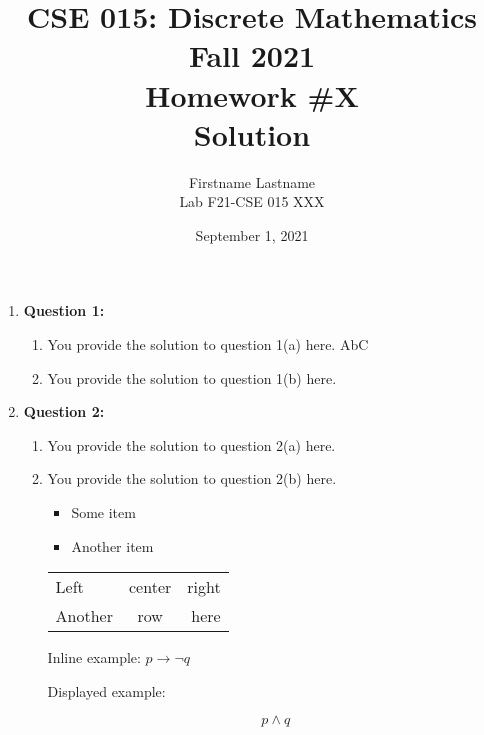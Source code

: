 \documentclass[11pt]{article}
\begin{document}
\author{Firstname Lastname\\
Lab F21-CSE 015 XXX}

\title{CSE 015: Discrete Mathematics\\
Fall 2021\\
Homework \#X\\
Solution}

\date{September 1, 2021}
\maketitle

\begin{enumerate}

\item
\textbf{Question 1:}

\begin{enumerate}[label=(\alph*)]
\item
You provide the solution to question 1(a) here.
AbC

\item
You provide the solution to question 1(b) here.

\end{enumerate}

\item
\textbf{Question 2:}

\begin{enumerate}[label=(\alph*)]
\item
You provide the solution to question 2(a) here.

\item
You provide the solution to question 2(b) here.

\begin{itemize}

\item Some item

\item Another item

\end{itemize}

\begin{tabular}{l c r}

Left & center & right \\
Another & row & here \\

\end{tabular}


Inline example: $p \rightarrow \lnot q$

Displayed example:

\begin{equation}
p \land q
\end{equation}


\end{enumerate}

\end{enumerate}
\end{document}
